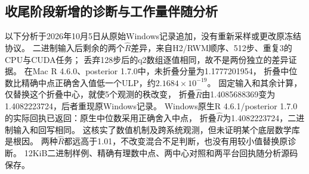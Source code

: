 \subsection{收尾阶段新增的诊断与工作量伴随分析}
\label{sec:completion-companion}
以下分析于2026年10月5日从原始Windows记录追加，没有重新采样或更改原冻结协议。
二进制输入后剩余的两个$\hat R$差异，来自H2/RWM顺序、512步、重复3的CPU与CUDA任务；
丢弃128步后的q2数组逐值相同，故不是两份独立的差异证据。
在Mac R 4.6.0、posterior 1.7.0中，未折叠分量为1.1777201954，
折叠中位数比精确中点正确舍入值低一个ULP，约$2.1684\times10^{-19}$。
固定输入和其余计算，仅替换这个折叠中心，就使5个观测的秩改变，
折叠$\hat R$由1.4085688369变为1.4082223724，后者重现原Windows记录。
Windows原生R 4.6.1/posterior 1.7.0的实际回执已返回：原生中位数采用正确舍入中点，
折叠$\hat R$为1.4082223724，二进制输入和回写相同。
这核实了数值机制及跨系统观测，但未证明某个底层数学库是根因。
两种$\hat R$都远高于1.01，不改变混合不足判断，也没有用较小值替换原诊断。
12KiB二进制样例、精确有理数中点、两中心对照和两平台回执随分析源码保存。

